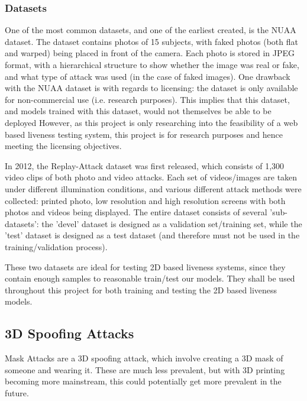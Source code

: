 \documentclass[10pt,a4paper]{article}
\begin{document}
        \subsubsection{Datasets}
        One of the most common datasets, and one of the earliest created, is the NUAA dataset.
        The dataset contains photos of 15 subjects, with faked photos (both flat and warped) being placed in front of the camera.
        Each photo is stored in JPEG format, with a hierarchical structure to show whether the image was real or fake, and what type of
        attack was used (in the case of faked images). One drawback with the NUAA dataset is with regards to licensing: the dataset is only available for
        non-commercial use (i.e. research purposes). This implies that this dataset, and models trained with this dataset, would not themselves be able to be deployed
        \cite{NUAADataset}
        However, as this project is only researching into the feasibility of a web based liveness testing system, this project is for research purposes and hence meeting the
        licensing objectives.

        In 2012, the Replay-Attack dataset was first released, which consists of 1,300 video clips of both photo and video attacks. Each
        set of videos/images are taken under different illumination conditions, and various different attack methods were collected: printed photo, low resolution and high resolution screens with both photos and 
        videos being displayed. The entire dataset consists of several 'sub-datasets': the 'devel' dataset is designed as a validation set/training set, while
        the 'test' dataset is designed as a test dataset (and therefore must not be used in the training/validation process). \cite{ReplayAttackDataset}

        These two datasets are ideal for testing 2D based liveness systems, since they contain enough samples to reasonable train/test our models. They shall be used
        throughout this project for both training and testing the 2D based liveness models.

            
    \subsection{3D Spoofing Attacks}
        Mask Attacks are a 3D spoofing attack, which involve creating a 3D mask of someone and wearing it. \cite{FaceSpoofingAttacksStudy} These are much less prevalent, but with 3D printing becoming more mainstream, this
        could potentially get more prevalent in the future.
\end{document}
